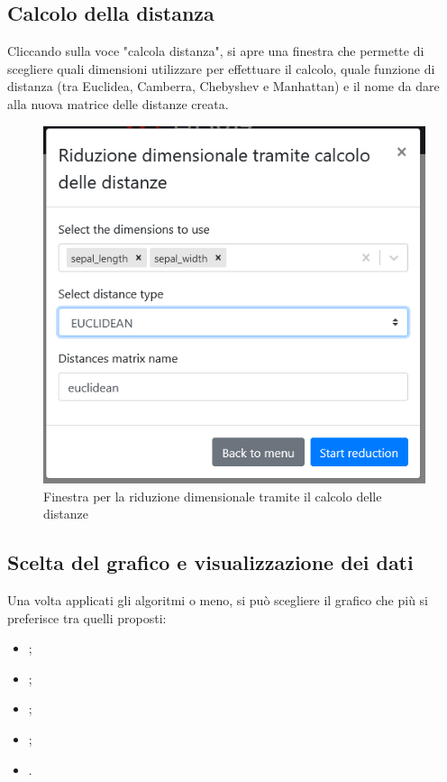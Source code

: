 \subsection{Calcolo della distanza}
Cliccando sulla voce "calcola distanza", si apre una finestra che permette di scegliere quali dimensioni utilizzare per effettuare il calcolo, quale funzione di distanza (tra Euclidea, Camberra, Chebyshev e Manhattan) e il nome da dare alla nuova matrice delle distanze creata.
\begin{figure}[H]
		\includegraphics[scale=0.5]{Images/CalcoloDistanze.png}
		\centering
		\caption{Finestra per la riduzione dimensionale tramite il calcolo delle distanze}
\end{figure}
\newpage
\subsection{Scelta del grafico e visualizzazione dei dati}
Una volta applicati gli algoritmi o meno, si può scegliere il grafico che più si preferisce tra quelli proposti:
\begin{itemize}
	\item {};
	\item {};
	\item {};
	\item {};
	\item {}.
\end{itemize}

